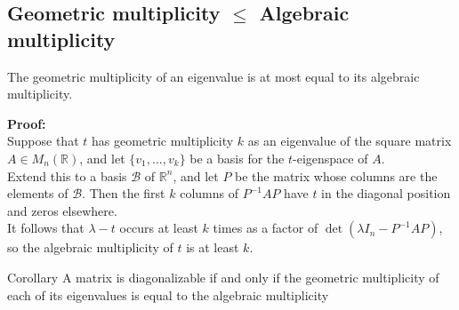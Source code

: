\documentclass[a4paper, 9pt]{extarticle}
\begin{document}
\subsection{Geometric multiplicity $\leq$ Algebraic multiplicity}
\begin{theorembox}{}{}
  The geometric multiplicity of an eigenvalue is at most equal to its algebraic multiplicity.
\end{theorembox}
\noindent\textbf{Proof:} \\
Suppose that $t$ has geometric multiplicity $k$ as an eigenvalue of the square matrix $A \in M_n(\mathbb{R})$, and let $\{v_1, \dots, v_k\}$ be a basis for the $t$-eigenspace of $A$. \\[2ex]
Extend this to a basis $\mathcal{B}$ of $\mathbb{R}^n$, and let $P$ be the matrix whose columns are the elements of $\mathcal{B}$. Then the first $k$ columns of $P^{-1}AP$ have $t$ in the diagonal position and zeros elsewhere. \\[2ex]
It follows that $\lambda - t$ occurs at least $k$ times as a factor of $\det(\lambda I_n - P^{-1}AP)$, so the algebraic multiplicity of $t$ is at least $k$.
\begin{theorembox}{Corollary}{}
  A matrix is diagonalizable if and only if the geometric multiplicity of each of its eigenvalues is equal to the algebraic multiplicity
\end{theorembox}
\end{document}
